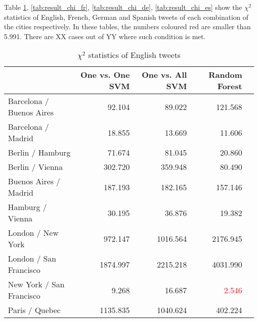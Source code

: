 Table \ref{tab:result_chi_en}, \ref{tab:result_chi_fr}, \ref{tab:result_chi_de}, \ref{tab:result_chi_es} show the $\chi^2$ statistics of English, French, German and Spanish tweets of each combination of the cities respectively.
In these tables, the numbers coloured red are smaller than 5.991.
There are XX cases out of YY where such condition is met.

\begin{table}[ht]
	\caption{$\chi^2$ statistics of English tweets}
	\begin{tabular}{|l|r|r|r|r|} \hline
	{}&One vs. One SVM &One vs. All SVM&Random Forest\\ \hline
	Barcelona / Buenos Aires & 92.104 & 89.022 & 121.568 \\ \hline
	Barcelona / Madrid & 18.855 & 13.669 & 11.606 \\ \hline
	Berlin / Hamburg & 71.674 & 81.045 & 20.860 \\ \hline
	Berlin / Vienna & 302.720 & 359.948 & 80.490\\ \hline
	Buenos Aires / Madrid & 187.193 & 182.165 & 157.146 \\ \hline
	Hamburg / Vienna & 30.195 & 36.876 & 19.382 \\ \hline

	London / New York & 972.147 & 1016.564 & 2176.945 \\ \hline
	London / San Francisco & 1874.997 & 2215.218 & 4031.990 \\ \hline
	New York / San Francisco & 9.268 & 16.687 & \textcolor{red}{2.546} \\ \hline
	Paris / Quebec & 1135.835 & 1040.624 & 402.224 \\ \hline
	\end{tabular}
	\label{tab:result_chi_en}
\end{table}


